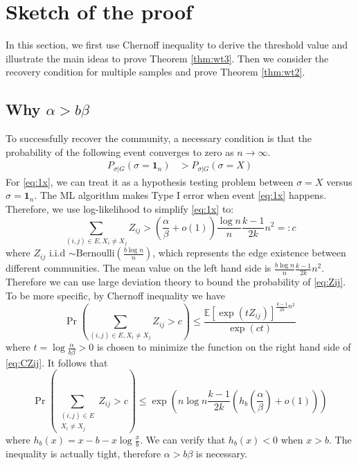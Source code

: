 \documentclass[conference]{IEEEtran}
\begin{document}
	\section{Sketch of the proof}
	\label{sect:sketch}
	
	In this section, we first use Chernoff inequality to derive the threshold value and illustrate the main ideas to prove Theorem \ref{thm:wt3}.
	Then we consider the recovery condition for multiple samples and prove Theorem \ref{thm:wt2}.
	
	\subsection{Why $\alpha > b \beta$}
	To successfully recover the community, a necessary condition is that the probability of the following event converges to zero as $n\to\infty$.
	\begin{align}
	P_{\sigma | G}(\sigma =  \mathbf{1}_n) & > P_{\sigma | G}(\sigma = X) \label{eq:1x}
	\end{align}
	For \eqref{eq:1x}, we can treat it as a hypothesis testing problem between $\sigma = X$ versus $\sigma = \mathbf{1}_n$.
	The ML algorithm makes Type I error when event \eqref{eq:1x} happens. Therefore, we use log-likelihood to simplify
	\eqref{eq:1x} to:
	\begin{equation}\label{eq:Zij}
	\sum_{(i,j)\in E, X_i \neq X_j} Z_{ij} > (\frac{\alpha}{\beta} + o(1)) \frac{\log n}{n} \frac{k-1}{2k}n^2 =: c
	\end{equation}
	where $Z_{ij}$ i.i.d $\sim \textrm{Bernoulli}(\frac{b\log n }{n})$, which represents the edge existence between different communities. The mean value on the left hand side is $\frac{b \log n }{n} \frac{k-1}{2k}n^2$. Therefore we can use large
	deviation theory to bound the probability of \eqref{eq:Zij}. To be more specific, by Chernoff inequality we have
	\begin{equation}\label{eq:CZij}
	\Pr\left(\sum_{(i,j)\in E, X_i \neq X_j} Z_{ij} >  c \right)\leq \frac{\mathbb{E}[\exp(t Z_{ij})]^{ \frac{k-1}{2k}n^2 }}{\exp(ct)}
	\end{equation}
	where $ t  = \log \frac{\alpha}{b\beta} > 0$ is chosen to minimize the function on the right hand side of \eqref{eq:CZij}. It follows that
	\begin{equation}\label{eq:nlogn}
	\Pr(\sum_{\substack{(i,j)\in E \\ X_i \neq X_j}} Z_{ij} >  c )\leq \exp(n\log n  \frac{k-1}{2k} (h_b(\frac{\alpha}{\beta}) + o(1)))
	\end{equation}
	where $h_b(x) = x - b - x \log\frac{x}{b}$. We can verify that $h_b(x) < 0 $ when $ x > b$. The inequality is actually tight,
	therefore $\alpha > b \beta$
	is necessary.
	
\end{document}
